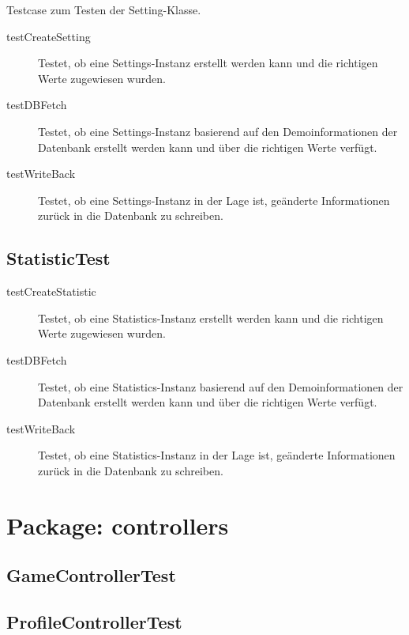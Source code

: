 \documentclass[parskip=full]{scrreprt}
\begin{document}
Testcase zum Testen der Setting-Klasse.

\begin{description}
	\item[testCreateSetting] Testet, ob eine Settings-Instanz erstellt werden kann und die richtigen Werte zugewiesen wurden.
	\item[testDBFetch] Testet, ob eine Settings-Instanz basierend auf den Demoinformationen der Datenbank erstellt werden kann und über die richtigen Werte verfügt.
	\item[testWriteBack] Testet, ob eine Settings-Instanz in der Lage ist, geänderte Informationen zurück in die Datenbank zu schreiben.
\end{description}

\subsection{StatisticTest}

\begin{description}
	\item[testCreateStatistic] Testet, ob eine Statistics-Instanz erstellt werden kann und die richtigen Werte zugewiesen wurden.
	\item[testDBFetch] Testet, ob eine Statistics-Instanz basierend auf den Demoinformationen der Datenbank erstellt werden kann und über die richtigen Werte verfügt.
	\item[testWriteBack] Testet, ob eine Statistics-Instanz in der Lage ist, geänderte Informationen zurück in die Datenbank zu schreiben.
\end{description}

\clearpage

\section{Package: controllers}

\subsection{GameControllerTest}

\begin{description}
	\item 
\end{description}

\subsection{ProfileControllerTest}
\end{document}
